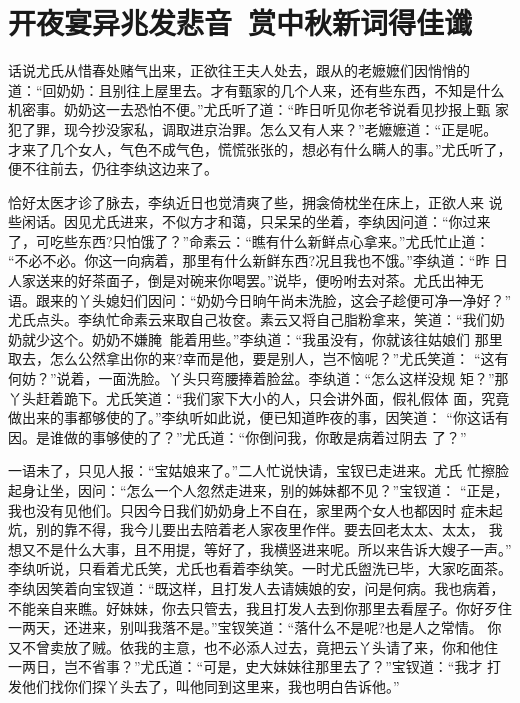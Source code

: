 \chapter{开夜宴异兆发悲音~赏中秋新词得佳谶}

话说尤氏从惜春处赌气出来，正欲往王夫人处去，跟从的老嬷嬷们因悄悄的
道：“回奶奶：且别往上屋里去。才有甄家的几个人来，还有些东西，不知是什么
机密事。奶奶这一去恐怕不便。”尤氏听了道：“昨日听见你老爷说看见抄报上甄
家犯了罪，现今抄没家私，调取进京治罪。怎么又有人来？”老嬷嬷道：“正是呢。
才来了几个女人，气色不成气色，慌慌张张的，想必有什么瞒人的事。”尤氏听了，
便不往前去，仍往李纨这边来了。

恰好太医才诊了脉去，李纨近日也觉清爽了些，拥衾倚枕坐在床上，正欲人来
说些闲话。因见尤氏进来，不似方才和蔼，只呆呆的坐着，李纨因问道：“你过来
了，可吃些东西?只怕饿了？”命素云：“瞧有什么新鲜点心拿来。”尤氏忙止道：
“不必不必。你这一向病着，那里有什么新鲜东西?况且我也不饿。”李纨道：“昨
日人家送来的好茶面子，倒是对碗来你喝罢。”说毕，便吩咐去对茶。尤氏出神无
语。跟来的丫头媳妇们因问：“奶奶今日晌午尚未洗脸，这会子趁便可净一净好？”
尤氏点头。李纨忙命素云来取自己妆奁。素云又将自己脂粉拿来，笑道：“我们奶
奶就少这个。奶奶不嫌腌，能着用些。”李纨道：“我虽没有，你就该往姑娘们
那里取去，怎么公然拿出你的来?幸而是他，要是别人，岂不恼呢？”尤氏笑道：
“这有何妨？”说着，一面洗脸。丫头只弯腰捧着脸盆。李纨道：“怎么这样没规
矩？”那丫头赶着跪下。尤氏笑道：“我们家下大小的人，只会讲外面，假礼假体
面，究竟做出来的事都够使的了。”李纨听如此说，便已知道昨夜的事，因笑道：
“你这话有因。是谁做的事够使的了？”尤氏道：“你倒问我，你敢是病着过阴去
了？”

一语未了，只见人报：“宝姑娘来了。”二人忙说快请，宝钗已走进来。尤氏
忙擦脸起身让坐，因问：“怎么一个人忽然走进来，别的姊妹都不见？”宝钗道：
“正是，我也没有见他们。只因今日我们奶奶身上不自在，家里两个女人也都因时
症未起炕，别的靠不得，我今儿要出去陪着老人家夜里作伴。要去回老太太、太太，
我想又不是什么大事，且不用提，等好了，我横竖进来呢。所以来告诉大嫂子一声。”
李纨听说，只看着尤氏笑，尤氏也看着李纨笑。一时尤氏盥洗已毕，大家吃面茶。
李纨因笑着向宝钗道：“既这样，且打发人去请姨娘的安，问是何病。我也病着，
不能亲自来瞧。好妹妹，你去只管去，我且打发人去到你那里去看屋子。你好歹住
一两天，还进来，别叫我落不是。”宝钗笑道：“落什么不是呢?也是人之常情。
你又不曾卖放了贼。依我的主意，也不必添人过去，竟把云丫头请了来，你和他住
一两日，岂不省事？”尤氏道：“可是，史大妹妹往那里去了？”宝钗道：“我才
打发他们找你们探丫头去了，叫他同到这里来，我也明白告诉他。”

